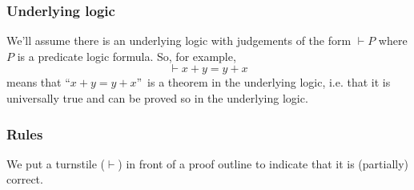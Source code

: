 \documentclass[muchmore,11pt]{article}%
\begin{document}
\subsubsection{Underlying logic}

We'll assume there is an underlying logic with judgements of the form $\vdash
P$ where $P$ is a predicate logic formula. So, for example,%
\[
\vdash x+y=y+x
\]
means that \textquotedblleft$x+y=y+x$\textquotedblright\ is a theorem in the
underlying logic, i.e. that it is universally true and can be proved so in the
underlying logic.

\subsubsection{Rules}

We put a turnstile ($\vdash$) in front of a proof outline to indicate that it
is (partially) correct.
\end{document}
